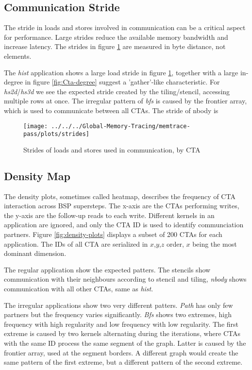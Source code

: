 \subsection{Communication Stride}
The stride in loads and stores involved in communication can be a critical aspect for performance. Large strides reduce the available memory bandwidth and increase latency. The strides in figure \ref{com-stride} are measured in byte distance, not elements.

The \textit{hist} application shows a large load stride in figure \ref{com-stride}, together with a large in-degree in figure \ref{fig:Cta-degree} suggest a 'gather'-like characteristic. For \textit{hs2d}/\textit{hs3d} we see the expected stride created by the tiling/stencil, accessing multiple rows at once.
The irregular pattern of \textit{bfs} is caused by the frontier array, which is used to communicate between all CTAs. The stride of nbody
is
\begin{figure}[t]
	\centering
	\texttt{[image: ../../../Global-Memory-Tracing/memtrace-pass/plots/strides]}
	\caption{Strides of loads and stores used in communication, by CTA}
	\label{com-stride}
\end{figure}
\subsection{Density Map}
The density plots, sometimes called heatmap, describes the frequency of CTA interaction across BSP supersteps. The x-axis are the CTAs performing writes, the y-axis are the follow-up reads to each write. Different kernels in an application are ignored, and only the CTA ID is used to identify communciation partners. Figure \ref{fig:density-plots} displays a subset of 200 CTAs for each application. The IDs of all CTA are serialized in $x$,$y$,$z$ order, $x$ being the most dominant dimension. 

The regular application show the expected patters. The stencils show communication with their neighbours according to stencil and tiling, \textit{nbody} shows communication with all other CTAs, same as \textit{hist}.

The irregular applications show two very different patters. \textit{Path} has only few partners but the frequency varies significantly. \textit{Bfs} shows two extremes, high frequency with high regularity and low frequency with low regularity.
The first extreme is caused by two kernels alternating during the iterations, where CTAs with the same ID process the same segment of the graph.  Latter is caused by the frontier array, used at the segment borders. A different graph would create the same pattern of the first extreme, but a different pattern of the second extreme.

